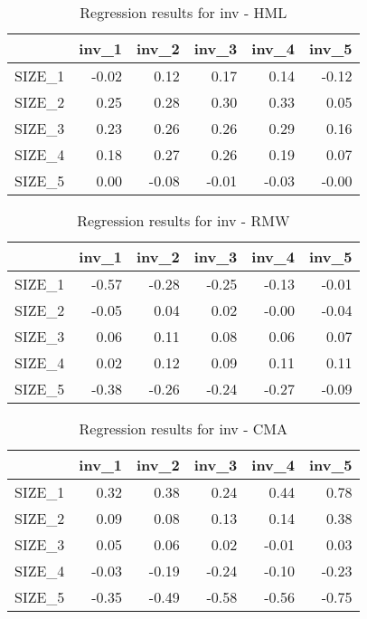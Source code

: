 \begin{table}[ht]
\centering
\caption{Regression results for inv - HML} 
\begin{tabular}{rrrrrr}
  \hline
 & inv\_1 & inv\_2 & inv\_3 & inv\_4 & inv\_5 \\ 
  \hline
SIZE\_1 & -0.02 & 0.12 & 0.17 & 0.14 & -0.12 \\ 
  SIZE\_2 & 0.25 & 0.28 & 0.30 & 0.33 & 0.05 \\ 
  SIZE\_3 & 0.23 & 0.26 & 0.26 & 0.29 & 0.16 \\ 
  SIZE\_4 & 0.18 & 0.27 & 0.26 & 0.19 & 0.07 \\ 
  SIZE\_5 & 0.00 & -0.08 & -0.01 & -0.03 & -0.00 \\ 
   \hline
\end{tabular}
\end{table}


\begin{table}[ht]
\centering
\caption{Regression results for inv - RMW} 
\begin{tabular}{rrrrrr}
  \hline
 & inv\_1 & inv\_2 & inv\_3 & inv\_4 & inv\_5 \\ 
  \hline
SIZE\_1 & -0.57 & -0.28 & -0.25 & -0.13 & -0.01 \\ 
  SIZE\_2 & -0.05 & 0.04 & 0.02 & -0.00 & -0.04 \\ 
  SIZE\_3 & 0.06 & 0.11 & 0.08 & 0.06 & 0.07 \\ 
  SIZE\_4 & 0.02 & 0.12 & 0.09 & 0.11 & 0.11 \\ 
  SIZE\_5 & -0.38 & -0.26 & -0.24 & -0.27 & -0.09 \\ 
   \hline
\end{tabular}
\end{table}


\begin{table}[ht]
\centering
\caption{Regression results for inv - CMA} 
\begin{tabular}{rrrrrr}
  \hline
 & inv\_1 & inv\_2 & inv\_3 & inv\_4 & inv\_5 \\ 
  \hline
SIZE\_1 & 0.32 & 0.38 & 0.24 & 0.44 & 0.78 \\ 
  SIZE\_2 & 0.09 & 0.08 & 0.13 & 0.14 & 0.38 \\ 
  SIZE\_3 & 0.05 & 0.06 & 0.02 & -0.01 & 0.03 \\ 
  SIZE\_4 & -0.03 & -0.19 & -0.24 & -0.10 & -0.23 \\ 
  SIZE\_5 & -0.35 & -0.49 & -0.58 & -0.56 & -0.75 \\ 
   \hline
\end{tabular}
\end{table}


